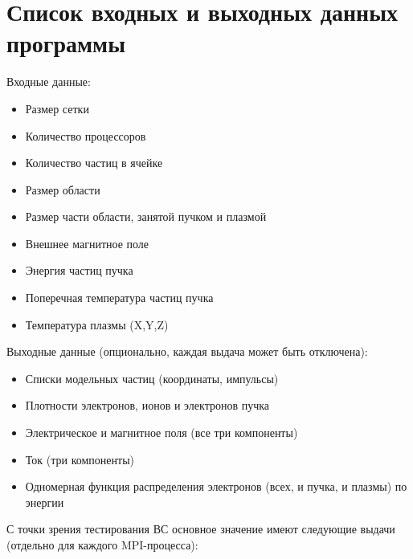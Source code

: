 \section{Список входных и выходных данных программы}	

Входные данные:
\begin{itemize}
\item Размер сетки
\item Количество процессоров
\item Количество частиц в ячейке
\item Размер области
\item Размер части области, занятой пучком и плазмой
\item Внешнее магнитное поле
\item Энергия частиц пучка
\item Поперечная температура частиц пучка
\item Температура плазмы (X,Y,Z)
\end{itemize}

Выходные данные (опционально, каждая выдача может быть отключена):
\begin{itemize}
\item Списки модельных частиц (координаты, импульсы)
\item Плотности электронов, ионов и электронов пучка
\item Электрическое и магнитное поля (все три компоненты)
\item Ток (три компоненты)
\item Одномерная функция распределения электронов (всех, и пучка, и плазмы) по энергии
\end{itemize}

С точки зрения тестирования ВС основное значение имеют следующие выдачи (отдельно для каждого MPI-процесса):

